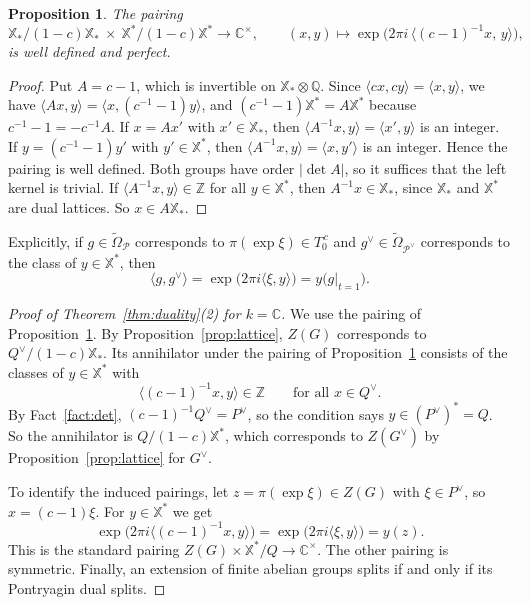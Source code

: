\documentclass[psamsfonts]{amsart}
\newtheorem{prop}[thm]{Proposition}
\theoremstyle{definition}
\theoremstyle{remark}
\numberwithin{equation}{section}
\newcommand{\Z}{\mathbb{Z}}   %
\newcommand{\Q}{\mathbb{Q}}
\newcommand{\X}{\mathbb{X}}
\newcommand{\ra}{\rightarrow}
\newcommand{\tOm}{\widetilde{\Omega}}
\newcommand\cP{\mathcal{P}}
\newcommand{\CC}{\mathbb{C}}
\numberwithin{equation}{section}
\theoremstyle{plain}
\begin{document}
\begin{prop}\label{prop:linking}
The pairing
\[
\X_*/(1-c)\X_*\ \times\ \X^*/(1-c)\X^*\ra\CC^\times,\qquad (x,y)\mapsto\exp\big(2\pi i\,\langle(c-1)^{-1}x,\,y\rangle\big),
\]
is well defined and perfect.
\end{prop}

\begin{proof}
Put $A=c-1$, which is invertible on $\X_*\otimes\Q$. Since $\langle cx,cy\rangle=\langle x,y\rangle$, we have $\langle Ax,y\rangle=\langle x,(c^{-1}-1)y\rangle$, and $(c^{-1}-1)\X^*=A\X^*$ because $c^{-1}-1=-c^{-1}A$. If $x=Ax'$ with $x'\in\X_*$, then $\langle A^{-1}x,y\rangle=\langle x',y\rangle$ is an integer. If $y=(c^{-1}-1)y'$ with $y'\in\X^*$, then $\langle A^{-1}x,y\rangle=\langle x,y'\rangle$ is an integer. Hence the pairing is well defined. Both groups have order $|\det A|$, so it suffices that the left kernel is trivial. If $\langle A^{-1}x,y\rangle\in\Z$ for all $y\in\X^*$, then $A^{-1}x\in\X_*$, since $\X_*$ and $\X^*$ are dual lattices. So $x\in A\X_*$.
\end{proof}

Explicitly, if $g\in \tOm_\cP$ corresponds to $\pi(\exp\xi)\in T_0^{\,c}$ and $g^\vee\in \tOm_{\cP^\vee}$ corresponds to the class of $y\in\X^*$, then
\[
\langle g,g^\vee\rangle=\exp\big(2\pi i\langle\xi,y\rangle\big)=y\big(g|_{t=1}\big).
\]

\begin{proof}[Proof of Theorem~\ref{thm:duality}(2) for $k=\CC$]
We use the pairing of Proposition~\ref{prop:linking}. By Proposition~\ref{prop:lattice}, $Z(G)$ corresponds to $Q^\vee/(1-c)\X_*$. Its annihilator under the pairing of Proposition~\ref{prop:linking} consists of the classes of $y\in\X^*$ with
\[
\langle(c-1)^{-1}x,y\rangle\in\Z\qquad\text{for all }x\in Q^\vee.
\]
By Fact~\ref{fact:det}, $(c-1)^{-1}Q^\vee=P^\vee$, so the condition says $y\in(P^\vee)^*=Q$. So the annihilator is $Q/(1-c)\X^*$, which corresponds to $Z(G^\vee)$ by Proposition~\ref{prop:lattice} for $G^\vee$.

To identify the induced pairings, let $z=\pi(\exp\xi)\in Z(G)$ with $\xi\in P^\vee$, so $x=(c-1)\xi$. For $y\in\X^*$ we get
\[
\exp\big(2\pi i\langle(c-1)^{-1}x,y\rangle\big)=\exp\big(2\pi i\langle\xi,y\rangle\big)=y(z).
\]
This is the standard pairing $Z(G)\times\X^*/Q\ra\CC^\times$. The other pairing is symmetric. Finally, an extension of finite abelian groups splits if and only if its Pontryagin dual splits.
\end{proof}
\end{document}
